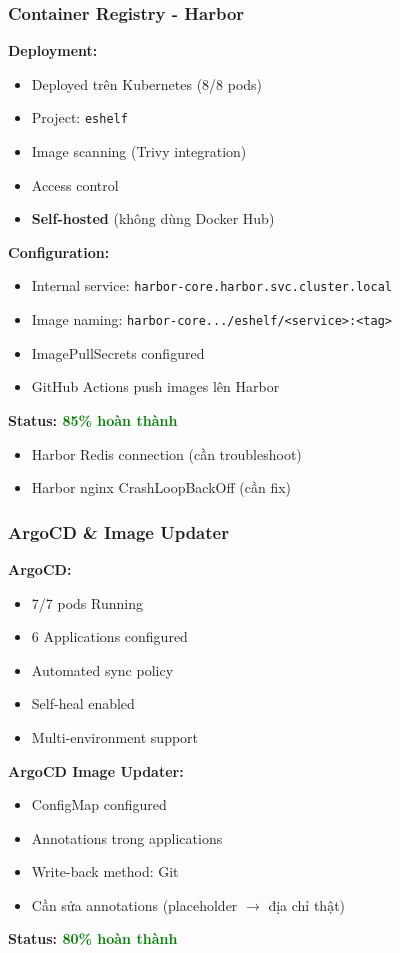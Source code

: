 \documentclass[aspectratio=169]{beamer}
\begin{document}
\begin{frame}
\frametitle{Container Registry - Harbor}
\textbf{Deployment:}
\begin{itemize}
    \item[$\checkmark$] Deployed trên Kubernetes (8/8 pods)
    \item[$\checkmark$] Project: \texttt{eshelf}
    \item[$\checkmark$] Image scanning (Trivy integration)
    \item[$\checkmark$] Access control
    \item[$\checkmark$] \textbf{Self-hosted} (không dùng Docker Hub)
\end{itemize}

\vspace{0.3cm}
\textbf{Configuration:}
\begin{itemize}
    \item Internal service: \texttt{harbor-core.harbor.svc.cluster.local}
    \item Image naming: \texttt{harbor-core.../eshelf/<service>:<tag>}
    \item ImagePullSecrets configured
    \item GitHub Actions push images lên Harbor
\end{itemize}

\vspace{0.3cm}
\textbf{Status: \textcolor{green}{85\% hoàn thành}}
\begin{itemize}
    \item[$\sim$] Harbor Redis connection (cần troubleshoot)
    \item[$\sim$] Harbor nginx CrashLoopBackOff (cần fix)
\end{itemize}
\end{frame}

\begin{frame}
\frametitle{ArgoCD \& Image Updater}
\textbf{ArgoCD:}
\begin{itemize}
    \item[$\checkmark$] 7/7 pods Running
    \item[$\checkmark$] 6 Applications configured
    \item[$\checkmark$] Automated sync policy
    \item[$\checkmark$] Self-heal enabled
    \item[$\checkmark$] Multi-environment support
\end{itemize}

\vspace{0.3cm}
\textbf{ArgoCD Image Updater:}
\begin{itemize}
    \item[$\checkmark$] ConfigMap configured
    \item[$\checkmark$] Annotations trong applications
    \item[$\checkmark$] Write-back method: Git
    \item[$\sim$] Cần sửa annotations (placeholder $\rightarrow$ địa chỉ thật)
\end{itemize}

\vspace{0.3cm}
\textbf{Status: \textcolor{green}{80\% hoàn thành}}
\end{frame}
\end{document}
